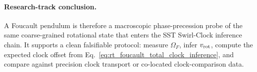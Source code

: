 \paragraph{Research-track conclusion.}
A Foucault pendulum is therefore a macroscopic phase-precession probe of the same coarse-grained rotational state that enters the SST Swirl-Clock inference chain.  It supports a clean falsifiable protocol: measure $\Omega_F$, infer $v_{\rm rot}$, compute the expected clock offset from Eq.~\eqref{eq:rt_foucault_total_clock_inference}, and compare against precision clock transport or co-located clock-comparison data.



\ifresearchtrackincluded\else

